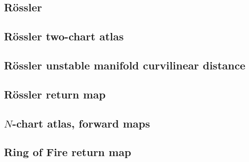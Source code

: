 \subsection{R\"ossler {\poincBord}}
\subsection{R\"ossler two-chart atlas}
\subsection{R\"ossler unstable manifold curvilinear distance}
\subsection{R\"ossler return map}
\subsection{$N$-chart atlas, forward maps}
\subsection{Ring of Fire return map}
